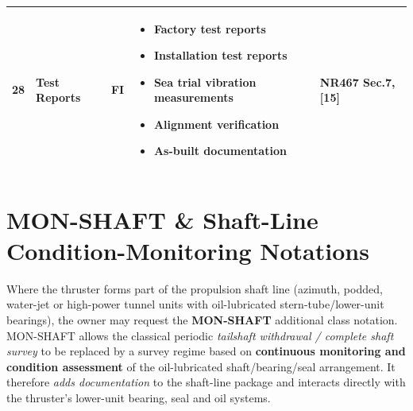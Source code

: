 \documentclass[11pt,a4paper]{report}
\newcommand{\fic}{\textbf{\textcolor{bvgray}{FI}}}
\begin{document}
\begin{longtable}{|p{0.5cm}|p{5cm}|p{1.5cm}|p{5.5cm}|p{2cm}|}
28 & Test Reports & \fic{} &
\begin{itemize}[leftmargin=*,nosep]
\item Factory test reports
\item Installation test reports
\item Sea trial vibration measurements
\item Alignment verification
\item As-built documentation
\end{itemize} & NR467 Sec.7, [15] \\
\hline

\end{longtable}

\section{MON-SHAFT \& Shaft-Line Condition-Monitoring Notations}
\label{sec:monshaft}

Where the thruster forms part of the propulsion shaft line (azimuth, podded,
water-jet or high-power tunnel units with oil-lubricated stern-tube/lower-unit
bearings), the owner may request the \textbf{MON-SHAFT} additional class
notation. MON-SHAFT allows the classical periodic \emph{tailshaft withdrawal /
complete shaft survey} to be replaced by a survey regime based on
\textbf{continuous monitoring and condition assessment} of the oil-lubricated
shaft/bearing/seal arrangement. It therefore \emph{adds documentation} to the
shaft-line package and interacts directly with the thruster's lower-unit
bearing, seal and oil systems.
\end{document}
